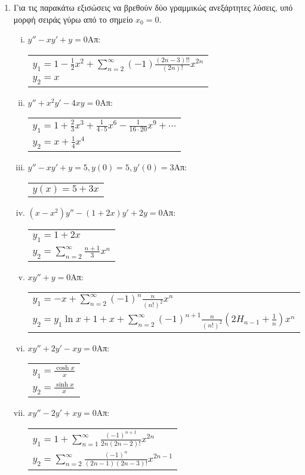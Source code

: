 \begin{enumerate}
\item Για τις παρακάτω εξισώσεις να βρεθούν δύο γραμμικώς ανεξάρτητες λύσεις, υπό μορφή σειράς γύρω από το σημείο $x_0=0$.
\begin{enumerate}[i)]
\item $y''-xy'+y=0$\hfill Απ: \begin{tabular}[t]{l}
$y_1=1-\frac{1}{2}x^2+\sum\limits_{n=2}^{\infty}(-1)\frac{(2n-3)!!}{(2n)!}x^{2n}$\\
$y_2=x$
\end{tabular}
\item $y''+x^2y'-4xy=0$\hfill Απ:\begin{tabular}[t]{l}$y_1=1+\frac{2}{3}x^3+\frac{1}{4\cdot 5}x^6-\frac{1}{16\cdot 20}x^9+\cdots$ \\[5pt]
$y_2=x+\frac{1}{4}x^4$
\end{tabular}
\item $y''-xy'+y=5, y(0)=5, y'(0)=3$\hfill Απ: \begin{tabular}[t]{l}
$y(x)=5+3x$
\end{tabular}
\item $(x-x^2)y''-(1+2x)y'+2y=0$\hfill Απ: \begin{tabular}[t]{l}
$y_1=1+2x$\\
$y_2=\sum\limits_{n=2}^{\infty}\frac{n+1}{3}x^n$
\end{tabular}
\item $xy''+y=0$\hfill Απ: \begin{tabular}[t]{l}
$y_1=-x+\sum\limits_{n=2}^{\infty}(-1)^n\frac{n}{(n!)^2}x^n$\\
$y_2=y_1\ln x+1+x+\sum\limits_{n=2}^{\infty}(-1)^{n+1}\frac{n}{(n!)^2}(2H_{n-1}+\frac{1}{n})x^n$
\end{tabular}
\item $xy''+2y'-xy=0$\hfill Απ: \begin{tabular}[t]{l}
$y_1=\frac{\cosh x}{x}$\\
$y_2=\frac{\sinh x}{x}$
\end{tabular}
\item $xy''-2y'+xy=0$\hfill Απ: \begin{tabular}[t]{l}
$y_1=1+\sum\limits_{n=1}^{\infty}\frac{(-1)^{n+1}}{2n(2n-2)!}x^{2n}$\\
$y_2=\sum\limits_{n=2}^{\infty}\frac{(-1)^n}{(2n-1)(2n-3)!}x^{2n-1}$
\end{tabular}


\end{enumerate}

\end{enumerate}




